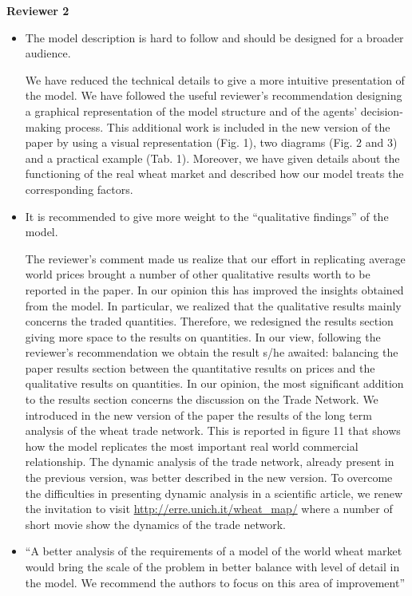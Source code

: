 \documentclass[a4paper,12pt]{article}
\begin{document}
\vskip1cm
\textbf{Reviewer 2}
\begin{itemize}
	\item The model description is hard to follow and should be designed for a broader audience.

		We have reduced the technical details to give a more intuitive presentation of the model. 
		We have followed the useful reviewer's recommendation designing a graphical representation of the model structure and of the agents' decision-making process. This additional work is included in the new version of the paper by using a visual representation (Fig. 1), two diagrams (Fig. 2 and 3) and a practical example (Tab. 1). Moreover, we have given details about the functioning of the real wheat market and described how our model treats the corresponding factors. 
    
\item It is recommended to give more weight to the ``qualitative findings'' of the model.

The reviewer's comment made us realize that our effort in replicating average world prices brought a number of other qualitative results worth to be reported in the paper. In our opinion this has improved the insights obtained from the model. 
In particular, we realized that the qualitative results mainly concerns the traded quantities. Therefore, we redesigned the results section giving more space to the results on quantities. In our view, following the reviewer's recommendation we obtain the result s/he awaited: balancing the paper results section between the quantitative results on prices and the qualitative results on quantities. 
In our opinion, the most significant addition to the results section concerns the discussion on the Trade Network. We introduced in the new version of the paper the results of the long term analysis of the wheat trade network. This is reported in figure 11 that shows how the model replicates the most important real world commercial relationship. The dynamic analysis of the trade network, already present in the previous version, was better described in the new version. To overcome the difficulties in presenting dynamic analysis in a scientific article, we renew the invitation to visit \url{http://erre.unich.it/wheat_map/} where a number of short movie show the dynamics of the trade network.       


    \item ``A better analysis of the requirements of a model of the world wheat market would bring the scale of the problem in better balance with level of detail in the model. We recommend the authors to focus on this area of improvement'' 
    

\end{itemize}
\end{document}
